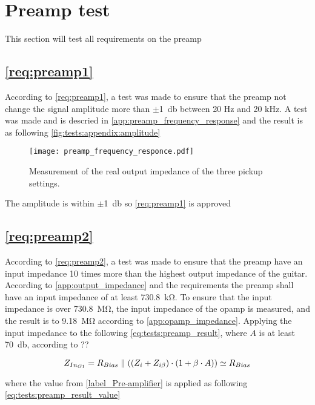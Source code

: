 \newpage
\section{Preamp test}
This section will test all requirements on the \gls{preamp} 


\subsection{\autoref{req:preamp1}}
According to \autoref{req:preamp1}, a test was made to ensure that the \gls{preamp} not change the signal amplitude more than $\pm$\SI{1}{\decibel} between 20 Hz and 20 kHz. A test was made and is descried in \autoref{app:preamp_frequency_response} and the result is as following \autoref{fig:tests:appendix:amplitude}

\begin{figure}[htbp!]
	\centering
		\texttt{[image: preamp\_frequency\_responce.pdf]}
		\caption{Measurement of the real output impedance of the three pickup settings.}
		\label{fig:tests:appendix:amplitude}
\end{figure}

The amplitude is within $\pm$\SI{1}{\decibel} so \autoref{req:preamp1} is approved


\subsection{\autoref{req:preamp2}}
According to \autoref{req:preamp2}, a test was made to ensure that the \gls{preamp} have an input impedance 10 times more than the highest output impedance of the guitar. According to \autoref{app:output_impedance} and the requirements the \gls{preamp} shall have an input impedance of at least \SI{730.8}{\kilo\ohm}. To ensure that the input impedance is over \SI{730.8}{\mega\ohm}, the input impedance of the \gls{opamp} is measured, and the result is to \SI{9.18}{\mega\ohm} according to \autoref{app:opamp_impedance}. Applying the input impedance to the following \autoref{eq:tests:preamp_result}, where $A$ is at least \SI{70}{\decibel}, according to ??  

\begin{equation}\label{eq:tests:preamp_result}
        Z_{In_{G1}} = R_{Bias} \parallel ((Z_i + Z_{i \beta}) \cdot (1+\beta \cdot A)) \simeq R_{Bias}
        \addunit{\si{\ohm}}
    \end{equation}

where the value from \autoref{label_Pre-amplifier} is applied as following \autoref{eq:tests:preamp_result_value}




